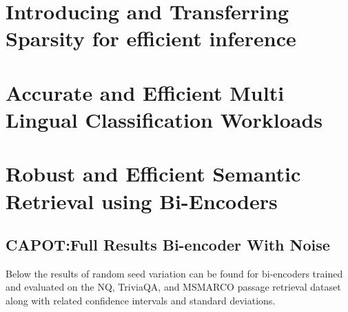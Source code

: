 \chapter{Introducing and Transferring Sparsity for efficient inference}
\chapter{Accurate and Efficient Multi Lingual Classification Workloads}
\chapter{Robust and Efficient Semantic Retrieval using Bi-Encoders}
\section{CAPOT:Full Results Bi-encoder With Noise}
Below the results of random seed variation can be found for bi-encoders trained and evaluated on the NQ, TriviaQA, and MSMARCO passage retrieval dataset along with related confidence intervals and standard deviations. 
